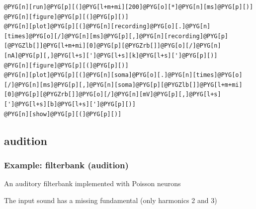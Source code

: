 \documentclass[letterpaper,10pt,english]{manual}
\begin{document}
\begin{Verbatim}[commandchars=@\[\]]
@PYG[n][run]@PYG[p][(]@PYG[l+m+mi][200]@PYG[o][*]@PYG[n][ms]@PYG[p][)]
@PYG[n][figure]@PYG[p][(]@PYG[p][)]
@PYG[n][plot]@PYG[p][(]@PYG[n][recording]@PYG[o][.]@PYG[n][times]@PYG[o][/]@PYG[n][ms]@PYG[p][,]@PYG[n][recording]@PYG[p][@PYGZlb[]]@PYG[l+m+mi][0]@PYG[p][@PYGZrb[]]@PYG[o][/]@PYG[n][nA]@PYG[p][,]@PYG[l+s][']@PYG[l+s][k]@PYG[l+s][']@PYG[p][)]
@PYG[n][figure]@PYG[p][(]@PYG[p][)]
@PYG[n][plot]@PYG[p][(]@PYG[n][soma]@PYG[o][.]@PYG[n][times]@PYG[o][/]@PYG[n][ms]@PYG[p][,]@PYG[n][soma]@PYG[p][@PYGZlb[]]@PYG[l+m+mi][0]@PYG[p][@PYGZrb[]]@PYG[o][/]@PYG[n][mV]@PYG[p][,]@PYG[l+s][']@PYG[l+s][b]@PYG[l+s][']@PYG[p][)]
@PYG[n][show]@PYG[p][(]@PYG[p][)]
\end{Verbatim}


\subsection{audition}

\resetcurrentobjects
\hypertarget{--doc-examples-audition_filterbank}{}

\hypertarget{index-19}{}\subsubsection{Example: filterbank (audition)}

An auditory filterbank implemented with Poisson neurons

The input sound has a missing fundamental (only harmonics 2 and 3)
\end{document}
